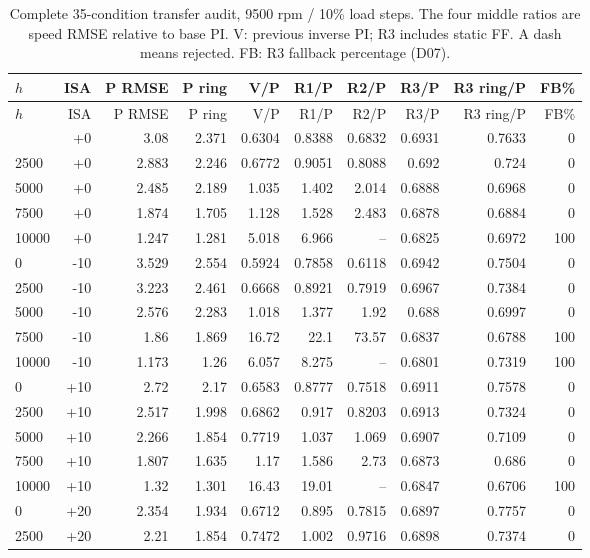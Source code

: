 {\small\setlength{\tabcolsep}{4pt}\begin{longtable}{@{}lrrrrrrrrr@{}}
\caption{Complete 35-condition transfer audit, 9500 rpm / 10\% load steps. The four middle ratios are speed RMSE relative to base PI. V: previous inverse PI; R3 includes static FF. A dash means rejected. FB: R3 fallback percentage (D07).}\label{tab:environment_all}\\\toprule $h$ & ISA & P RMSE & P ring & V/P & R1/P & R2/P & R3/P & R3 ring/P & FB\%\\\midrule
\endfirsthead\toprule $h$ & ISA & P RMSE & P ring & V/P & R1/P & R2/P & R3/P & R3 ring/P & FB\%\\\midrule
\endhead\bottomrule\endfoot
0 & +0 & 3.08 & 2.371 & 0.6304 & 0.8388 & 0.6832 & 0.6931 & 0.7633 & 0\\
2500 & +0 & 2.883 & 2.246 & 0.6772 & 0.9051 & 0.8088 & 0.692 & 0.724 & 0\\
5000 & +0 & 2.485 & 2.189 & 1.035 & 1.402 & 2.014 & 0.6888 & 0.6968 & 0\\
7500 & +0 & 1.874 & 1.705 & 1.128 & 1.528 & 2.483 & 0.6878 & 0.6884 & 0\\
10000 & +0 & 1.247 & 1.281 & 5.018 & 6.966 & -- & 0.6825 & 0.6972 & 100\\
0 & -10 & 3.529 & 2.554 & 0.5924 & 0.7858 & 0.6118 & 0.6942 & 0.7504 & 0\\
2500 & -10 & 3.223 & 2.461 & 0.6668 & 0.8921 & 0.7919 & 0.6967 & 0.7384 & 0\\
5000 & -10 & 2.576 & 2.283 & 1.018 & 1.377 & 1.92 & 0.688 & 0.6997 & 0\\
7500 & -10 & 1.86 & 1.869 & 16.72 & 22.1 & 73.57 & 0.6837 & 0.6788 & 100\\
10000 & -10 & 1.173 & 1.26 & 6.057 & 8.275 & -- & 0.6801 & 0.7319 & 100\\
0 & +10 & 2.72 & 2.17 & 0.6583 & 0.8777 & 0.7518 & 0.6911 & 0.7578 & 0\\
2500 & +10 & 2.517 & 1.998 & 0.6862 & 0.917 & 0.8203 & 0.6913 & 0.7324 & 0\\
5000 & +10 & 2.266 & 1.854 & 0.7719 & 1.037 & 1.069 & 0.6907 & 0.7109 & 0\\
7500 & +10 & 1.807 & 1.635 & 1.17 & 1.586 & 2.73 & 0.6873 & 0.686 & 0\\
10000 & +10 & 1.32 & 1.301 & 16.43 & 19.01 & -- & 0.6847 & 0.6706 & 100\\
0 & +20 & 2.354 & 1.934 & 0.6712 & 0.895 & 0.7815 & 0.6897 & 0.7757 & 0\\
2500 & +20 & 2.21 & 1.854 & 0.7472 & 1.002 & 0.9716 & 0.6898 & 0.7374 & 0\\

\end{longtable}}

